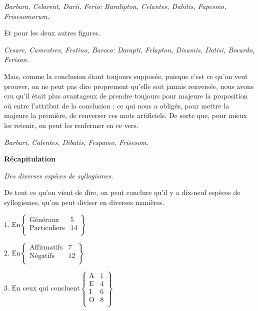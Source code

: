 \emph{Barbara, Celarent, Darii, Ferio: Baralipton, Celantes, Dabitis, Fapesmo, Frisesomorum.}

Et pour les deux autres figures.

\emph{Cesare, Camestres, Festino, Baroco: Darapti, Felapton, Disamis, Datisi, Bocardo, Ferison.}

Mais, comme la conclusion étant toujours supposée, puisque c'est ce qu'on veut prouver, on ne peut pas dire proprement qu'elle soit jamais renversée, nous avons cru qu'il était plus avantageux de prendre toujours pour majeure la proposition où entre l'attribut de la conclusion : ce qui nous a obligés, pour mettre la majeure la première, de renverser ces mots artificiels. De sorte que, pour mieux les retenir, on peut les renfermer en ce vers.

\emph{Barbari, Calentes, Dibatis, Fespamo, Frisesom.}

\newpage

\begin{center}{\bfseries Récapitulation}\end{center}

	\begin{center}\emph{Des diverses espèces de syllogismes.}\end{center}

De tout ce qu'on vient de dire, on peut conclure qu'il y a dix-neuf espèces de syllogismes, qu'on peut diviser en diverses manières.

\begin{center}
$ \text {$1$. En} \left  \{
    \begin{array}{lc}
	    \text {Généraux} & \text{5} \\
	    \text {Particuliers} & \text{14} \\
    \end{array}
    \right \} $
\end{center}

\begin{center}
$ \text {$2$. En} \left \{
    \begin{array}{lc}
	    \text {Affirmatifs} & \text{7} \\
	    \text {Négatifs} & \text{12} \\
    \end{array}
    \right \} $
\end{center}

\begin{center}
$ \text {$3$. En ceux qui concluent}
	\left \{
    	\begin{array}{cc}
		\text {A} & \text{1} \\
  		\text {E} & \text{4} \\
  		\text {I} & \text{6} \\
		\text {O} & \text{8} \\
    	\end{array}
	\right \}$
\end{center}

